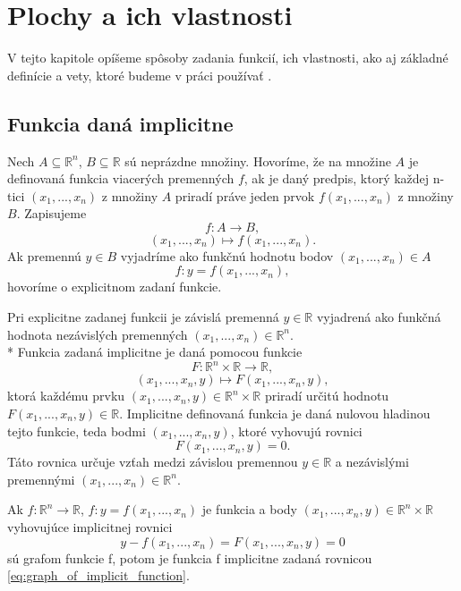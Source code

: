 \chapter{Plochy a ich vlastnosti}

\label{kap:plochy} %

V tejto kapitole opíšeme spôsoby zadania funkcií, ich vlastnosti, 
ako aj základné definície a vety, ktoré budeme v práci používať \cite{filo_rostas}.

\section{Funkcia daná implicitne}

\begin{definition}
    Nech $A \subseteq \mathbb{R}^n$, $B \subseteq \mathbb{R}$ sú neprázdne množiny. 
Hovoríme, že na množine $A$ je definovaná funkcia viacerých premenných
$f$, ak je daný predpis, ktorý každej n-tici $(x_1, . . . , x_n)$
z množiny $A$ priradí práve jeden prvok $f(x_1, . . . , x_n)$ z množiny $B$.
Zapisujeme 
$$f : A \to B,$$
$$(x_1, . . . , x_n) \mapsto f(x_1, . . . , x_n).$$
Ak premennú $y \in B$ vyjadríme ako funkčnú hodnotu bodov $(x_1, . . . , x_n) \in A$
$$f : y = f(x_1, . . . , x_n),$$
hovoríme o explicitnom zadaní funkcie.
\end{definition}


Pri explicitne zadanej funkcii je závislá premenná $y \in \mathbb{R}$ vyjadrená ako funkčná hodnota nezávislých
premenných $(x_1, . . . , x_n)\in\mathbb{R}^n$.
\\*
Funkcia zadaná implicitne je daná pomocou funkcie $$F : \mathbb{R}^n \times \mathbb{R} \to \mathbb{R},$$
$$(x_1, . . . ,x_n, y) \mapsto F(x_1, . . . , x_n, y),$$ ktorá každému prvku $(x_1, . . . ,x_n, y) \in \mathbb{R}^{n} \times \mathbb{R}$ 
priradí určitú hodnotu \mbox{$F(x_1, . . . , x_n, y) \in \mathbb{R}$.}
Implicitne definovaná funkcia je daná nulovou hladinou tejto funkcie, teda bodmi $(x_1, . . . , x_n, y)$, 
ktoré vyhovujú rovnici $$F(x_1, . . . , x_n, y) = 0.$$  
Táto rovnica určuje vzťah medzi závislou premennou $y \in \mathbb{R}$
a nezávislými premennými $(x_1, . . . , x_n) \in \mathbb{R}^n$. 

\begin{note}
    Ak $f : \mathbb{R}^n \to \mathbb{R}$, $f: y = f(x_1, . . . , x_n)$ je funkcia a body
    $(x_1, . . . , x_n, y) \in \mathbb{R}^n \times \mathbb{R}$ vyhovujúce implicitnej rovnici
        \begin{equation}
        \label{eq:graph_of_implicit_function}
        y - f(x_1, ..., x_n) = F(x_1, . . . , x_n, y) = 0
        \end{equation}
    sú grafom funkcie f,
    potom je funkcia f implicitne zadaná rovnicou \ref{eq:graph_of_implicit_function}.
\end{note}

